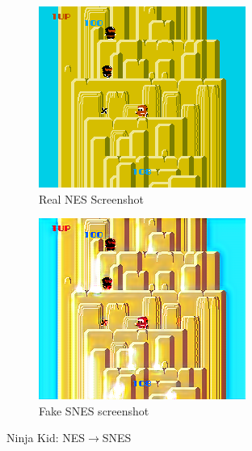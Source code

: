 \documentclass[10pt,twocolumn,letterpaper]{article}
\begin{document}
\begin{figure}[H]
   \centering
   \begin{subfigure}[b]{0.235\textwidth}
      \includegraphics[width=\textwidth]{figures/nes_to_snes/Ninja_Kun_-_Majou_no_Bouken_(J)__ucc__8_real_A.png}
      \caption{Real NES Screenshot}
      \label{fig:ss4a}
   \end{subfigure}
   \begin{subfigure}[b]{0.235\textwidth}
      \includegraphics[width=\textwidth]{figures/nes_to_snes/Ninja_Kun_-_Majou_no_Bouken_(J)__ucc__8_fake_B.png}
      \caption{Fake SNES screenshot}
      \label{fig:ss4b}
   \end{subfigure}
   \caption{Ninja Kid: NES$\rightarrow$SNES}
\end{figure}
\end{document}
